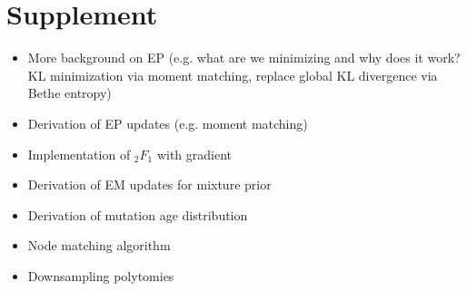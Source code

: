 \documentclass{article}
\begin{document}
\section{Supplement}
\begin{itemize}
\item More background on EP (e.g. what are we minimizing and why does it work? KL minimization via moment matching, replace global KL divergence via Bethe entropy)
\item Derivation of EP updates (e.g. moment matching)
\item Implementation of ${_2}F_1$ with gradient
\item Derivation of EM updates for mixture prior
\item Derivation of mutation age distribution
\item Node matching algorithm
\item Downsampling polytomies
\end{itemize}
\end{document}
